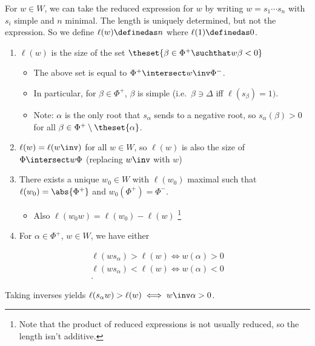 For \(w\in W\), we can take the reduced expression for \(w\) by writing
\(w = s_1 \cdots s_n\) with \(s_i\) simple and \(n\) minimal. The length
is uniquely determined, but not the expression. So we define
\(\ell(w) \definedas n\) where \(\ell(1) \definedas 0\).

\begin{fact}

\envlist

\begin{enumerate}
\def\labelenumi{\arabic{enumi}.}
\item
  \(\ell(w)\) is the size of the set
  \(\theset{\beta\in\Phi^+ \suchthat w\beta < 0}\)

  \begin{itemize}
  \tightlist
  \item
    The above set is equal to \(\Phi^+ \intersect w\inv \Phi^-\).
  \item
    In particular, for \(\beta \in \Phi^+\), \(\beta\) is simple
    (i.e.~\(\beta \ni \Delta\) iff \(\ell(s_\beta) = 1)\).
  \item
    Note: \(\alpha\) is the only root that \(s_\alpha\) sends to a
    negative root, so \(s_\alpha(\beta) > 0\) for all
    \(\beta\in\Phi^+\setminus\theset{\alpha}\).
  \end{itemize}
\item
  \(\ell(w) = \ell(w\inv)\) for all \(w\in W\), so \(\ell(w)\) is also
  the size of \(\Phi \intersect w\Phi\) (replacing \(w\inv\) with \(w\))
\item
  There exists a unique \(w_0 \in W\) with \(\ell(w_0)\) maximal such
  that \(\ell(w_0) = \abs{\Phi^+}\) and \(w_0(\Phi^+) = \Phi^-\).

  \begin{itemize}
  \tightlist
  \item
    Also \(\ell(w_0 w) = \ell(w_0) - \ell(w)\) \footnote{Note that the
      product of reduced expressions is not usually reduced, so the
      length isn't additive.}
  \end{itemize}
\item
  For \(\alpha \in \Phi^+\), \(w\in W\), we have either
\end{enumerate}

\begin{align*}
\ell(w s_\alpha) > \ell (w) \iff w(\alpha) > 0 \\
\ell(w s_\alpha) < \ell (w) \iff w(\alpha) < 0 \\
.\end{align*}

Taking inverses yields
\(\ell(s_\alpha w) > \ell(w) \iff w\inv\alpha > 0\).

\end{fact}

